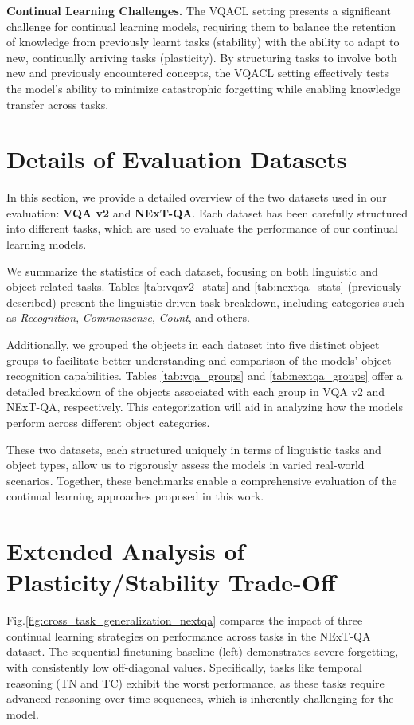 \noindent\textbf{Continual Learning Challenges.} The VQACL setting presents a significant challenge for continual learning models, requiring them to balance the retention of knowledge from previously learnt tasks (stability) with the ability to adapt to new, continually arriving tasks (plasticity). By structuring tasks to involve both new and previously encountered concepts, the VQACL setting effectively tests the model's ability to minimize catastrophic forgetting while enabling knowledge transfer across tasks.

\section{Details of Evaluation Datasets}
\label{sec:datasets_order}
In this section, we provide a detailed overview of the two datasets used in our evaluation: \textbf{VQA v2} and \textbf{NExT-QA}. Each dataset has been carefully structured into different tasks, which are used to evaluate the performance of our continual learning models.

We summarize the statistics of each dataset, focusing on both linguistic and object-related tasks. Tables \ref{tab:vqav2_stats} and \ref{tab:nextqa_stats} (previously described) present the linguistic-driven task breakdown, including categories such as \textit{Recognition}, \textit{Commonsense}, \textit{Count}, and others.

Additionally, we grouped the objects in each dataset into five distinct object groups to facilitate better understanding and comparison of the models' object recognition capabilities. Tables \ref{tab:vqa_groups} and \ref{tab:nextqa_groups} offer a detailed breakdown of the objects associated with each group in VQA v2 and NExT-QA, respectively. This categorization will aid in analyzing how the models perform across different object categories.

These two datasets, each structured uniquely in terms of linguistic tasks and object types, allow us to rigorously assess the models in varied real-world scenarios. Together, these benchmarks enable a comprehensive evaluation of the continual learning approaches proposed in this work.

\section{Extended Analysis of Plasticity/Stability Trade-Off}
\label{extended_analysis}
Fig.\ref{fig:cross_task_generalization_nextqa} compares the impact of three continual learning strategies on performance across tasks in the NExT-QA dataset. The sequential finetuning baseline (left) demonstrates severe forgetting, with consistently low off-diagonal values. Specifically, tasks like temporal reasoning (TN and TC) exhibit the worst performance, as these tasks require advanced reasoning over time sequences, which is inherently challenging for the model.


